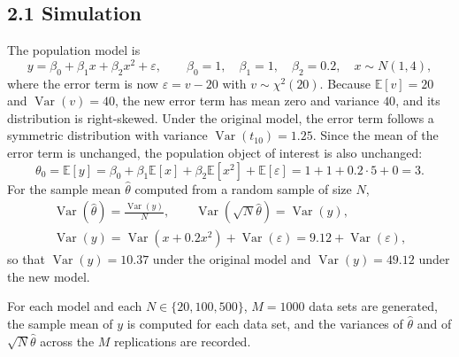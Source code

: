 \documentclass{HW} %
\newcommand{\E}{\mathbb{E}}
\newcommand{\Var}{\operatorname{Var}}
\begin{document}
\subsection*{2.1 Simulation}
The population model is
\[ y = \beta_0 + \beta_1 x + \beta_2 x^2 + \varepsilon, \qquad \beta_0 = 1,\quad \beta_1 = 1,\quad \beta_2 = 0.2,\quad x \sim N(1,4), \]
where the error term is now $\varepsilon = v - 20$ with $v \sim \chi^2(20)$. Because $\E[v] = 20$ and $\Var(v) = 40$, the new error term has mean zero and variance $40$, and its distribution is right-skewed. Under the original model, the error term follows a symmetric distribution with variance $\Var(t_{10}) = 1.25$. Since the mean of the error term is unchanged, the population object of interest is also unchanged:
\[ \theta_0 = \E[y] = \beta_0 + \beta_1 \E[x] + \beta_2 \E[x^2] + \E[\varepsilon] = 1 + 1 + 0.2 \cdot 5 + 0 = 3. \]
For the sample mean $\hat\theta$ computed from a random sample of size $N$,
\[ \begin{gathered} \Var(\hat\theta) = \frac{\Var(y)}{N}, \qquad \Var(\sqrt{N}\hat\theta) = \Var(y), \\ \Var(y) = \Var(x + 0.2x^2) + \Var(\varepsilon) = 9.12 + \Var(\varepsilon), \end{gathered} \]
so that $\Var(y) = 10.37$ under the original model and $\Var(y) = 49.12$ under the new model.

For each model and each $N \in \{20, 100, 500\}$, $M = 1000$ data sets are generated, the sample mean of $y$ is computed for each data set, and the variances of $\hat\theta$ and of $\sqrt{N}\hat\theta$ across the $M$ replications are recorded.
\end{document}
